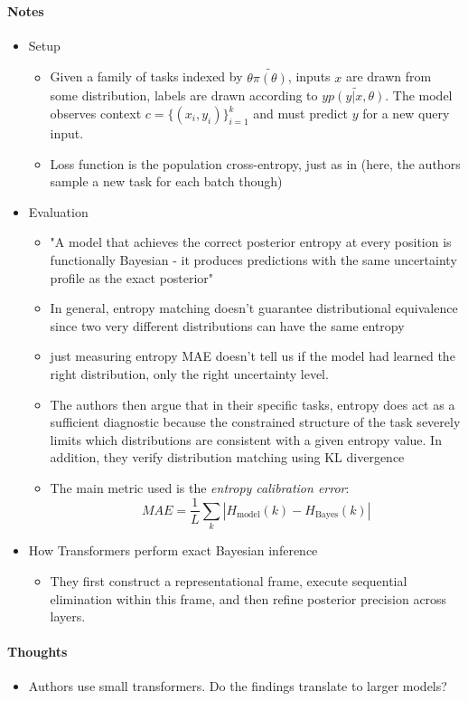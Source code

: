 \documentclass[12pt,a4paper,twoside]{article}
\begin{document}
\begin{paper}
	\paragraph{Notes}
	\begin{itemize}
		\item Setup
		\begin{itemize}
			\item Given a family of tasks indexed by $\theta \tilde{\pi(\theta)}$, inputs $x$ are drawn from some distribution, labels are drawn according to $y\tilde{p(y|x, \theta)}$. The model observes context $c=\{ (x_i, y_i)\}^k_{i=1}$ and must predict $y$ for a new query input.
			\item Loss function is the population cross-entropy, just as in \cite{Mller2022} (here, the authors sample a new task for each batch though)
 		\end{itemize}
		\item Evaluation
		\begin{itemize}
			\item "A model that achieves the correct posterior entropy at every position is functionally Bayesian - it produces predictions with the same uncertainty profile as the exact posterior"
			\item In general, entropy matching doesn't guarantee distributional equivalence since two very different distributions can have the same entropy
			\item[$\rightarrow$] just measuring entropy MAE doesn't tell us if the model had learned the right distribution, only the right uncertainty level.
			\item[$\rightarrow$] The authors then argue that in their specific tasks, entropy does act as a sufficient diagnostic because the constrained structure of the task severely limits which distributions are consistent with a given entropy value. In addition, they verify distribution matching using KL divergence
			\item[$\rightarrow$] The main metric used is the \textit{entropy calibration error}: \[ MAE = \frac{1}{L}\sum_k |H_\text{model}(k)-H_\text{Bayes}(k)|\]  
		\end{itemize}
		\item How Transformers perform exact Bayesian inference
		\begin{itemize}
			\item They first construct a representational frame, execute sequential elimination within this frame, and then refine posterior precision across layers.
		\end{itemize}
	\end{itemize}
	\paragraph{Thoughts}
	\begin{itemize}
		\item Authors use small transformers. Do the findings translate to larger models?
	\end{itemize}
\end{paper}
\end{document}
